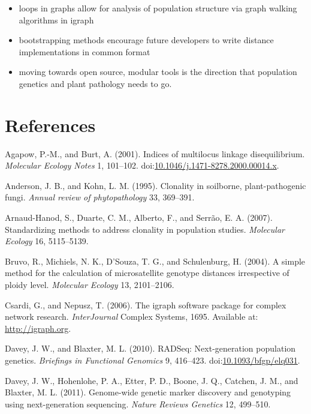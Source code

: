 \documentclass{frontiersSCNS} %
\begin{document}
\begin{itemize}
\itemsep1pt\parskip0pt
\item
  loops in graphs allow for analysis of population structure via graph
  walking algorithms in igraph
\item
  bootstrapping methods encourage future developers to write distance
  implementations in common format
\item
  moving towards open source, modular tools is the direction that
  population genetics and plant pathology needs to go.
\end{itemize}

\section*{References}\label{references}

Agapow, P.-M., and Burt, A. (2001). Indices of multilocus linkage
disequilibrium. \emph{Molecular Ecology Notes} 1, 101--102.
doi:\href{http://dx.doi.org/10.1046/j.1471-8278.2000.00014.x}{10.1046/j.1471-8278.2000.00014.x}.

Anderson, J. B., and Kohn, L. M. (1995). Clonality in soilborne,
plant-pathogenic fungi. \emph{Annual review of phytopathology} 33,
369--391.

Arnaud-Hanod, S., Duarte, C. M., Alberto, F., and Serr{ã}o, E. A.
(2007). Standardizing methods to address clonality in population
studies. \emph{Molecular Ecology} 16, 5115--5139.

Bruvo, R., Michiels, N. K., D'Souza, T. G., and Schulenburg, H. (2004).
A simple method for the calculation of microsatellite genotype distances
irrespective of ploidy level. \emph{Molecular Ecology} 13, 2101--2106.

Csardi, G., and Nepusz, T. (2006). The igraph software package for
complex network research. \emph{InterJournal} Complex Systems, 1695.
Available at: \url{http://igraph.org}.

Davey, J. W., and Blaxter, M. L. (2010). RADSeq: Next-generation
population genetics. \emph{Briefings in Functional Genomics} 9,
416--423.
doi:\href{http://dx.doi.org/10.1093/bfgp/elq031}{10.1093/bfgp/elq031}.

Davey, J. W., Hohenlohe, P. A., Etter, P. D., Boone, J. Q., Catchen, J.
M., and Blaxter, M. L. (2011). Genome-wide genetic marker discovery and
genotyping using next-generation sequencing. \emph{Nature Reviews
Genetics} 12, 499--510.
\end{document}
